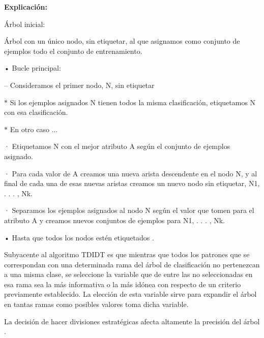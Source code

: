 \documentclass[10pt]{article}
\begin{document}
\setlength{\parskip}{2mm}

\textbf{Explicación:}

Árbol inicial:

Árbol con un único nodo, sin etiquetar, al que asignamos como conjunto de ejemplos todo el conjunto de entrenamiento.

\setlength{\parskip}{2mm}

• Bucle principal:

\setlength{\parskip}{2mm}

– Consideramos el primer nodo, N, sin etiquetar
\setlength{\parskip}{2mm}

$\ast$ Si los ejemplos asignados N tienen todos la misma clasificación,  etiquetamos N con esa clasificación.

\setlength{\parskip}{2mm}

$\ast$ En otro caso ...

\setlength{\parskip}{2mm}

· Etiquetamos N con el mejor atributo A según el conjunto de
ejemplos asignado.
\setlength{\parskip}{2mm}

· Para cada valor de A creamos una nueva arista descendente en el nodo N, y al final de cada una de esas nuevas aristas creamos un nuevo nodo sin etiquetar, N1, . . . , Nk.

\setlength{\parskip}{2mm}

· Separamos los ejemplos asignados al nodo N según el valor que tomen para el atributo A y creamos nuevos conjuntos de ejemplos para N1, . . . , Nk.


\setlength{\parskip}{2mm}

• Hasta que todos los nodos estén etiquetados \cite{IEEEreferencias:Ref15}.

Subyacente al algoritmo TDIDT es que mientras que todos los patrones que se correspondan con una determinada rama del árbol de clasificación no pertenezcan a una misma clase, se seleccione la variable que de entre las no seleccionadas en esa rama sea la más informativa o la más idónea con respecto de un criterio previamente establecido. La elección de esta variable sirve para expandir el árbol en tantas ramas como posibles valores toma dicha variable\cite{IEEEreferencias:Ref15}.

La decisión de hacer divisiones estratégicas afecta altamente la precisión del árbol \cite{IEEEreferencias:Ref44}.
\end{document}
